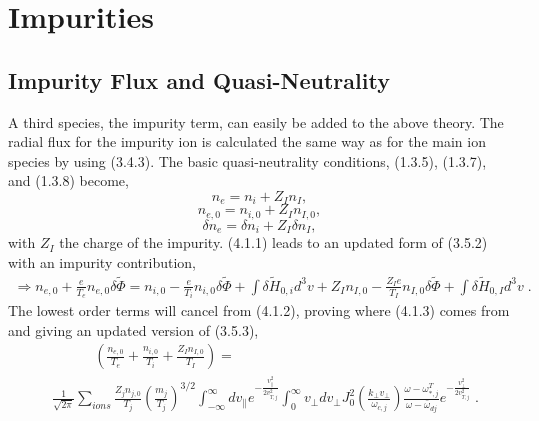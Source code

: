 \documentclass[12pt]{article}
\numberwithin{equation}{subsection}
\begin{document}
\section{Impurities}

\subsection{Impurity Flux and Quasi-Neutrality}
   \quad A third species, the impurity term, can easily be added to the above theory. The radial flux for the impurity ion is calculated the same way as for
the main ion species by using (3.4.3). The basic quasi-neutrality conditions, (1.3.5), (1.3.7), and (1.3.8) become,
   \begin{equation}
      n_e = n_i + Z_In_I,
   \end{equation}
   \begin{equation}
      n_{e,0} = n_{i,0} + Z_In_{I,0},
   \end{equation}
   \begin{equation}
      \delta n_e = \delta n_i + Z_I\delta n_I,
   \end{equation}
with $Z_I$ the charge of the impurity. (4.1.1) leads to an updated form of (3.5.2) with an impurity contribution,
   \begin{equation}
   \begin{aligned}
      \Rightarrow n_{e,0} + \frac{e}{T_e}n_{e,0}\delta\widetilde{\Phi} = n_{i,0} - \frac{e}{T_i}n_{i,0}\delta\widetilde{\Phi} + \int\delta\widetilde{H}_{0,i}d^3v
                + Z_In_{I,0} - \frac{Z_Ie}{T_I}n_{I,0}\delta\widetilde{\Phi} + \int\delta\widetilde{H}_{0,I}d^3v\;.
   \end{aligned}
   \end{equation}
The lowest order terms will cancel from (4.1.2), proving where (4.1.3) comes from and giving an updated version of (3.5.3),
   \begin{equation}
   \begin{aligned}
      &\quad\quad\quad(\frac{n_{e,0}}{T_e} + \frac{n_{i,0}}{T_i} + \frac{Z_I n_{I,0}}{T_I}) = \\
      &\frac{1}{\sqrt{2\pi}}\sum\limits_{ions}\frac{Z_jn_{j,0}}{T_j}\left(\frac{m_j}{T_j}\right)^{3/2}
      \int_{-\infty}^{\infty}dv_\parallel e^{-\frac{v_\parallel^2}{2v^2_{T,j}}}
      \int_{0}^{\infty}v_\perp dv_\perp J_0^2(\frac{k_\perp v_\perp}{\omega_{c,j}})
      \frac{\omega - \omega_{*,j}^T}{\omega - \bar{\omega}_{dj}}e^{-\frac{v_\perp^2}{2v_{T,j}^2}}\;.
   \end{aligned}
   \end{equation}
\end{document}
